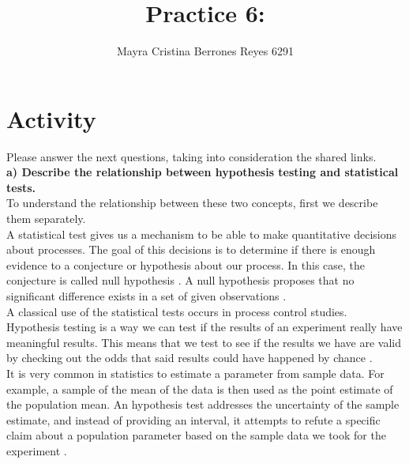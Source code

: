 \documentclass{article}
\begin{document}
\title{%
  Practice 6: } %
\author{Mayra Cristina Berrones Reyes 6291}

\maketitle

\section{Activity}

Please answer the next questions, taking into consideration the shared links.\\

\textbf{a) Describe the relationship between hypothesis testing and statistical tests.}\\

To understand the relationship between these two concepts, first we describe them separately.\\

A statistical test gives us a mechanism to be able to make quantitative decisions about processes. The goal of this decisions is to determine if there is enough evidence to  a conjecture or hypothesis about our process. In this case, the conjecture is called null hypothesis \cite{montgomery2009}. A null hypothesis proposes that no significant difference exists in a set of given observations \cite{tdsc}.\\

A classical use of the statistical tests occurs in process control studies. \\

Hypothesis testing is a way we can test if the results of an experiment really have meaningful results. This means that we test to see if the results we have are valid by checking out the odds that said results could have happened by chance \cite{sthowto}. \\

It is very common in statistics to estimate a parameter from sample data. For example, a sample of the mean of the data is then used as the point estimate of the population mean. An hypothesis test addresses the uncertainty of the sample estimate, and instead of providing an interval, it attempts to refute a specific claim about a population parameter based on the sample data we took for the experiment \cite{montgomery2009}.\\
\end{document}
